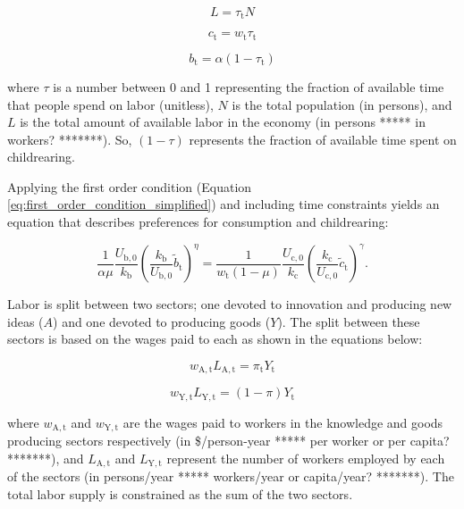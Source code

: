 \documentclass[letterpaper,12pt]{article}
\begin{document}
\begin{equation}\label{eq:pop_work}
	L = \tau_\mathrm{t} N
\end{equation}

\begin{equation} \label{eq:consumption_constraint}
	c_\mathrm{t} = w_\mathrm{t} \tau_\mathrm{t}
\end{equation}

\begin{equation} \label{eq:birth_constraint}
	b_\mathrm{t} = \alpha (1-\tau_\mathrm{t})
\end{equation}

\noindent where $\tau$ is a number between 0 and 1 representing the fraction of available time that people spend on labor (unitless), $N$ is the total population (in persons), and $L$ is the total amount of available labor in the economy (in persons ***** in workers? *******). So, $(1-\tau)$ represents the fraction of available time spent on childrearing.

Applying the first order condition (Equation \ref{eq:first_order_condition_simplified}) and including time constraints yields an equation that describes preferences for consumption and childrearing:

\begin{equation} \label{eq:FOC_and_time_constraints}
	\frac{1}{\alpha \mu} \frac{U_\mathrm{b,0}}{k_\mathrm{b}} \left( \frac{k_\mathrm{b}}{U_\mathrm{b,0}} \tilde b_\mathrm{t} \right) ^{\eta} 
	= \frac{1}{w_\mathrm{t}(1-\mu)} \frac{U_\mathrm{c,0}}{k_\mathrm{c}}  \left( \frac{k_\mathrm{c}}{U_\mathrm{c,0}} \tilde c_\mathrm{t} \right)^\gamma .
\end{equation}

Labor is split between two sectors; one devoted to innovation and producing new ideas ($A$) and one devoted to producing goods ($Y$). The split between these sectors is based on the wages paid to each as shown in the equations below:

\begin{equation} \label{eq:knowledge_comp}
	w_\mathrm{A,t} L_\mathrm{A,t} = \pi_\mathrm{t} Y_\mathrm{t}
\end{equation}

\begin{equation} \label{eq:labor_comp}
	w_\mathrm{Y,t} L_\mathrm{Y,t} = (1-\pi) Y_\mathrm{t}
\end{equation}

\noindent where $w_\mathrm{A,t}$ and $w_\mathrm{Y,t}$ are the wages paid to workers in the knowledge and goods producing sectors respectively (in \$/person-year ***** per worker or per capita? *******), and $L_\mathrm{A,t}$ and $L_\mathrm{Y,t}$ represent the number of workers employed by each of the sectors (in persons/year ***** workers/year or capita/year? *******). The total labor supply is constrained as the sum of the two sectors.
\end{document}
